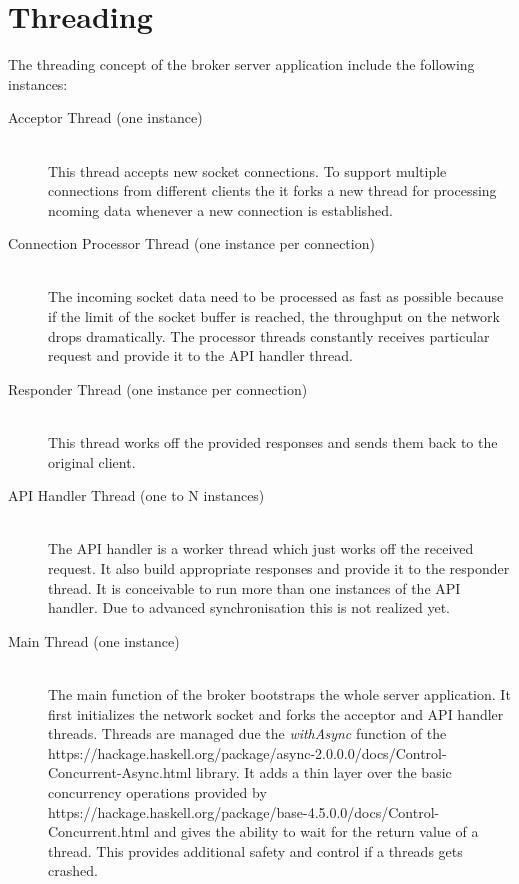 \newpage
\section{Threading}
\label{sec:impl-broker-threading}
The threading concept of the broker server application include the following
instances: 

\begin{description}
\item[Acceptor Thread (one instance)] \hfill \\
    This thread accepts new socket connections. To support multiple
    connections from different clients the it forks a new thread for processing
    ncoming data whenever a new connection is established. 

\item[Connection Processor Thread (one instance per connection)] \hfill \\
    The incoming socket data need to be processed as fast as possible because if the
    limit of the socket buffer is reached, the throughput on the network drops
    dramatically. The processor threads constantly receives particular request and
    provide it to the API handler thread. 

\item[Responder Thread (one instance per connection)] \hfill \\
    This thread works off the provided responses and sends them back to the original
    client.
\item [API Handler Thread (one to N instances)] \hfill  \\
    The API handler is a worker thread which just works off the received request. It
    also build appropriate responses and provide it to the responder thread. It is
    conceivable to run more than one instances of the API handler. Due to advanced
    synchronisation this is not realized yet.
\item [Main Thread (one instance)] \hfill \\
    The main function of the broker bootstraps the whole server application. It first
    initializes the network socket and forks the acceptor and API
    handler threads. Threads are managed due the \textit{withAsync} function of
    the 
    {https://hackage.haskell.org/package/async-2.0.0.0/docs/Control-Concurrent-Async.html}
    library. It adds a thin layer over the basic concurrency operations provided
    by 
    {https://hackage.haskell.org/package/base-4.5.0.0/docs/Control-Concurrent.html}
    and gives the ability to wait for the return value of a thread. This
    provides additional safety and control if a threads gets crashed. 
\end{description}

